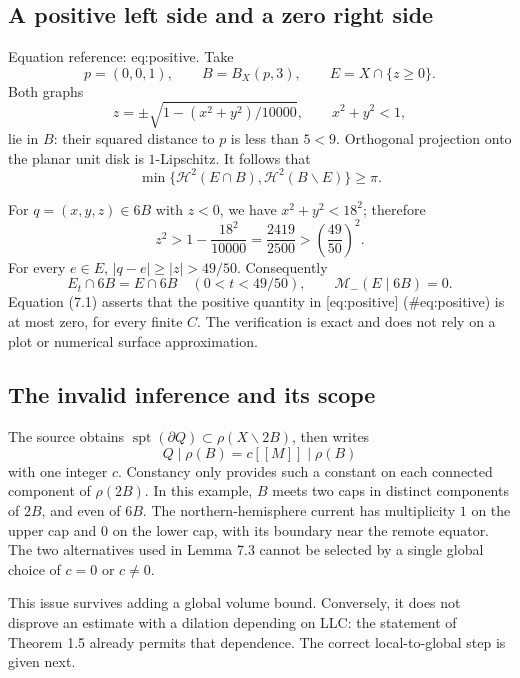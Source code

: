 \documentclass[10pt]{article}
\begin{document}
\subsection*{A positive left side and a zero right side}
Equation reference: eq:positive. Take \[p=(0,0,1),\qquad B=B_X(p,3),\qquad E=X\cap\{z\ge0\}.\] Both graphs \[z=\pm\sqrt{1-(x^2+y^2)/10000},\qquad x^2+y^2<1,\] lie in \(B\): their squared distance to \(p\) is less than \(5<9\). Orthogonal projection onto the planar unit disk is \(1\)-Lipschitz. It follows that \[
 \min\{\mathcal H^2(E\cap B),\mathcal H^2(B\smallsetminus E)\}\ge\pi.\]\par
For \(q=(x,y,z)\in6B\) with \(z<0\), we have \(x^2+y^2<18^2\); therefore \[z^2>1-\frac{18^2}{10000}
       =\frac{2419}{2500}>
          \left(\frac{49}{50}\right)^2.\] For every \(e\in E\), \(|q-e|\ge|z|>49/50\). Consequently \[E_t\cap6B=E\cap6B\quad(0<t<49/50),\qquad
 \mathcal M_-(E\mid6B)=0.\] Equation (7.1) asserts that the positive quantity in [eq:positive] (\#eq:positive) is at most zero, for every finite \(C\). The verification is exact and does not rely on a plot or numerical surface approximation.\par
\subsection*{The invalid inference and its scope}
The source obtains \(\operatorname{spt}(\partial Q)\subset\rho(X\smallsetminus2B)\), then writes \[Q\mathbin{\vert}\rho(B)
       =c[\![M]\!]\mathbin{\vert}\rho(B)\] with one integer \(c\). Constancy only provides such a constant on each connected component of \(\rho(2B)\). In this example, \(B\) meets two caps in distinct components of \(2B\), and even of \(6B\). The northern-hemisphere current has multiplicity \(1\) on the upper cap and \(0\) on the lower cap, with its boundary near the remote equator. The two alternatives used in Lemma 7.3 cannot be selected by a single global choice of \(c=0\) or \(c\ne0\).\par
This issue survives adding a global volume bound. Conversely, it does not disprove an estimate with a dilation depending on LLC: the statement of Theorem 1.5 already permits that dependence. The correct local-to-global step is given next.\par
\end{document}
